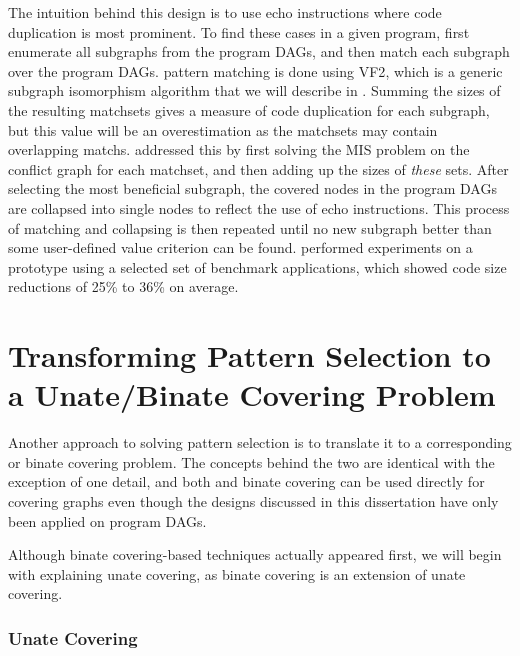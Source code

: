 The intuition behind this design is to use \glspl{echo instruction} where code
duplication is most prominent.
%
To find these cases in a given \gls{program},
\citeauthor{Brisk2004} first enumerate all \glspl{subgraph} from the
\glspl{program DAG}, and then match each \gls{subgraph} over the \glspl{program
  DAG}.
%
\Gls{pattern matching} is done using \gls{VF2}, which is a generic
\gls{subgraph isomorphism} algorithm that we will describe in
.
%
Summing the sizes of the resulting \glspl{matchset}
gives a measure of code duplication for each \gls{subgraph}, but this value will
be an overestimation as the \glspl{matchset} may contain overlapping
\glspl{match}.
%
\citeauthor{Brisk2004} addressed this by first solving the
\gls{MIS problem} on the \gls{conflict graph} for each \gls{matchset}, and then
adding up the sizes of \emph{these} sets.
%
After selecting the most beneficial
\gls{subgraph}, the covered \glspl{node} in the \glspl{program DAG} are
collapsed into single \glspl{node} to reflect the use of \glspl{echo
  instruction}.
%
This process of matching and collapsing is then repeated until
no new \gls{subgraph} better than some user-defined value criterion can be
found.
%
\citeauthor{Brisk2004} performed experiments on a prototype using a
selected set of benchmark applications, which showed code size reductions of
25\% to 36\% on average.


\section{Transforming Pattern Selection to a Unate/Binate Covering Problem}

Another approach to solving \gls{pattern selection} is to translate it to a
corresponding  or \gls{binate
  covering} problem.
%
The concepts behind the two are identical with the
exception of one detail, and both  and \gls{binate
  covering} can be used directly for covering \glspl{graph} even though the
designs discussed in this dissertation have only been applied on \glspl{program DAG}.

Although \gls{binate covering}-based techniques actually appeared first, we will
begin with explaining \gls{unate covering}, as \gls{binate covering} is an
extension of \gls{unate covering}.


\subsubsection{Unate Covering}

